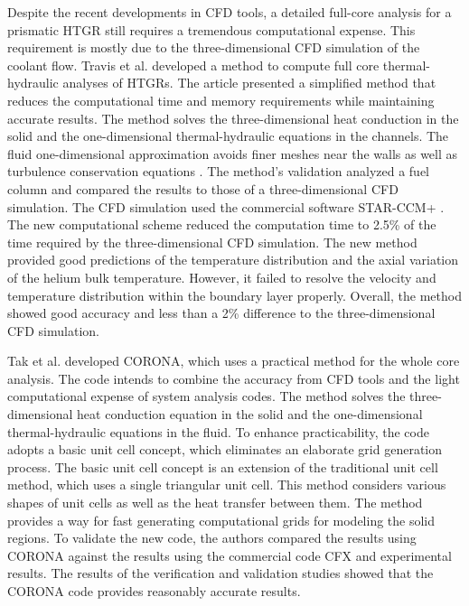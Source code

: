 Despite the recent developments in CFD tools, a detailed full-core analysis for a prismatic \gls{HTGR} still requires a tremendous computational expense.
This requirement is mostly due to the three-dimensional CFD simulation of the coolant flow.
Travis et al. \cite{travis_thermalhydraulics_2013} developed a method to compute full core thermal-hydraulic analyses of \glspl{HTGR}.
The article presented a simplified method that reduces the computational time and memory requirements while maintaining accurate results.
The method solves the three-dimensional heat conduction in the solid and the one-dimensional thermal-hydraulic equations in the channels.
The fluid one-dimensional approximation avoids finer meshes near the walls as well as turbulence conservation equations \cite{tak_development_2014}.
The method's validation analyzed a fuel column and compared the results to those of a three-dimensional CFD simulation.
The CFD simulation used the commercial software STAR-CCM+ \cite{cd-adapco_star-ccm_2012}.
The new computational scheme reduced the computation time to 2.5\% of the time required by the three-dimensional CFD simulation.
The new method provided good predictions of the temperature distribution and the axial variation of the helium bulk temperature.
However, it failed to resolve the velocity and temperature distribution within the boundary layer properly.
Overall, the method showed good accuracy and less than a 2\% difference to the three-dimensional CFD simulation.

Tak et al. \cite{tak_practical_2012} \cite{tak_development_2014} developed CORONA, which uses a practical method for the whole core analysis.
The code intends to combine the accuracy from CFD tools and the light computational expense of system analysis codes.
The method solves the three-dimensional heat conduction equation in the solid and the one-dimensional thermal-hydraulic equations in the fluid.
To enhance practicability, the code adopts a basic unit cell concept, which eliminates an elaborate grid generation process.
The basic unit cell concept is an extension of the traditional unit cell method, which uses a single triangular unit cell.
This method considers various shapes of unit cells as well as the heat transfer between them.
The method provides a way for fast generating computational grids for modeling the solid regions.
To validate the new code, the authors compared the results using CORONA against the results using the commercial code CFX and experimental results.
The results of the verification and validation studies showed that the CORONA code provides reasonably accurate results.

